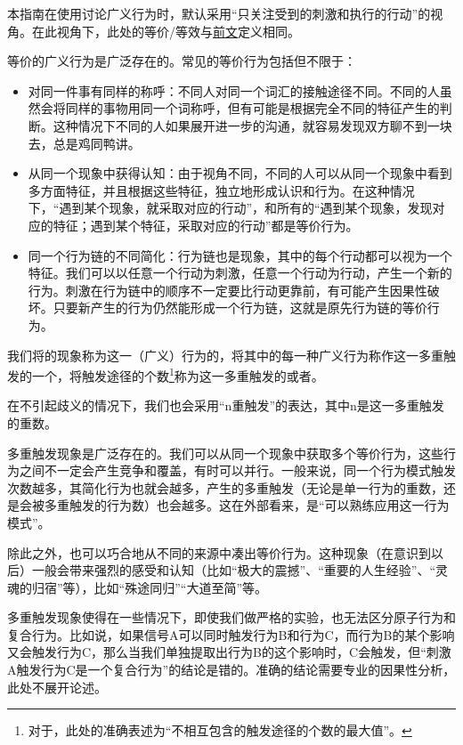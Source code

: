 \begin{explain}
本指南在使用讨论广义行为时，默认采用“只关注受到的刺激和执行的行动”的视角。在此视角下，此处的等价/等效与\hyperref[def:等价]{前文}定义相同。

等价的广义行为是广泛存在的。常见的等价行为包括但不限于：
\begin{itemize}
\item 对同一件事有同样的称呼：不同人对同一个词汇的接触途径不同。不同的人虽然会将同样的事物用同一个词称呼，但有可能是根据完全不同的特征产生的判断。这种情况下不同的人如果展开进一步的沟通，就容易发现双方聊不到一块去，总是鸡同鸭讲。
\item 从同一个现象中获得认知：由于视角不同，不同的人可以从同一个现象中看到多方面特征，并且根据这些特征，独立地形成认识和行为。在这种情况下，“遇到某个现象，就采取对应的行动”，和所有的“遇到某个现象，发现对应的特征；遇到某个特征，采取对应的行动”都是等价行为。
\item 同一个行为链的不同简化：行为链也是现象，其中的每个行动都可以视为一个特征。我们可以以任意一个行动为刺激，任意一个行动为行动，产生一个新的行为。刺激在行为链中的顺序不一定要比行动更靠前，有可能产生因果性破坏。只要新产生的行为仍然能形成一个行为链，这就是原先行为链的等价行为。
\end{itemize}
\end{explain}
我们将的现象称为这一（广义）行为的，将其中的每一种广义行为称作这一多重触发的一个，将触发途径的个数\footnote{对于\rigorous，此处的准确表述为“不相互包含的触发途径的个数的最大值”。}称为这一多重触发的或者。
\begin{explain}
在不引起歧义的情况下，我们也会采用“n重触发”的表达，其中n是这一多重触发的重数。


多重触发现象是广泛存在的。我们可以从同一个现象中获取多个等价行为，这些行为之间不一定会产生竞争和覆盖，有时可以并行。一般来说，同一个行为模式触发次数越多，其简化行为也就会越多，产生的多重触发（无论是单一行为的重数，还是会被多重触发的行为数）也会越多。这在外部看来，是“可以熟练应用这一行为模式”。

除此之外，也可以巧合地从不同的来源中凑出等价行为。这种现象（在意识到以后）一般会带来强烈的感受和认知（比如“极大的震撼”、“重要的人生经验”、“灵魂的归宿”等），比如“殊途同归”“大道至简”等。

多重触发现象使得在一些情况下，即使我们做严格的实验，也无法区分原子行为和复合行为。比如说，如果信号A可以同时触发行为B和行为C，而行为B的某个影响又会触发行为C，那么当我们单独提取出行为B的这个影响时，C会触发，但“刺激A触发行为C是一个复合行为”的结论是错的。准确的结论需要专业的因果性分析，此处不展开论述。
\end{explain}


